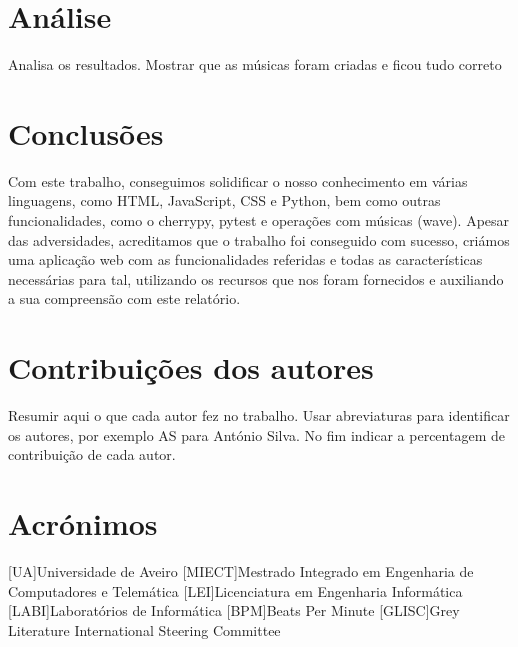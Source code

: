\documentclass{report}
\begin{document}

\chapter{Análise}
\label{chap.analise}
Analisa os resultados.
Mostrar que as músicas foram criadas e ficou tudo correto

\chapter{Conclusões}
\label{chap.conclusao}
Com este trabalho, conseguimos solidificar o nosso conhecimento em várias linguagens, como HTML, JavaScript, CSS e 
Python, bem como outras funcionalidades, como o cherrypy, pytest e operações com músicas (wave).
Apesar das adversidades, acreditamos que o trabalho foi conseguido com sucesso, criámos uma aplicação 
web com as funcionalidades referidas e todas as características necessárias para tal, utilizando os recursos que 
nos foram fornecidos e auxiliando a sua compreensão com este relatório.

\chapter*{Contribuições dos autores}
Resumir aqui o que cada autor fez no trabalho.
Usar abreviaturas para identificar os autores,
por exemplo AS para António Silva.
No fim indicar a percentagem de contribuição de cada autor.

\chapter*{Acrónimos}
\begin{acronym}
[UA]{Universidade de Aveiro}
[MIECT]{Mestrado Integrado em Engenharia de Computadores e Telemática}
[LEI]{Licenciatura em Engenharia Informática}
[LABI]{Laboratórios de Informática}
[BPM]{Beats Per Minute}
[GLISC]{Grey Literature International Steering Committee}
\end{acronym}


\printbibliography
\end{document}
